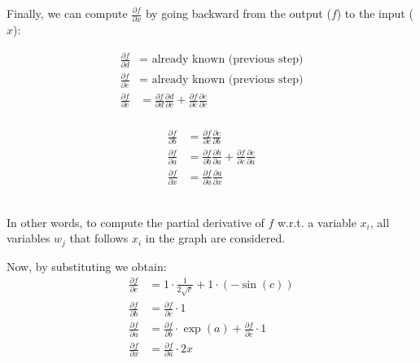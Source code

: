 \begin{example}
    Finally, we can compute $\frac{\partial f}{\partial x}$ by going backward from the output ($f$) to the input ($x$):\\
    \begin{minipage}{.5\linewidth}
        \[
            \begin{split}
                \frac{\partial f}{\partial d} &= \text{ already known (previous step)} \\
                \frac{\partial f}{\partial e} &= \text{ already known (previous step)} \\
                \frac{\partial f}{\partial c} &= 
                    \frac{\partial f}{\partial d}\frac{\partial d}{\partial c} + \frac{\partial f}{\partial e}\frac{\partial e}{\partial c} \\
            \end{split}
        \]
    \end{minipage}%
    \begin{minipage}{.5\linewidth}
        \[
            \begin{split}
                \frac{\partial f}{\partial b} &= \frac{\partial f}{\partial c}\frac{\partial c}{\partial b} \\
                \frac{\partial f}{\partial a} &= 
                    \frac{\partial f}{\partial b}\frac{\partial b}{\partial a} + \frac{\partial f}{\partial c}\frac{\partial c}{\partial a} \\
                \frac{\partial f}{\partial x} &= \frac{\partial f}{\partial a}\frac{\partial a}{\partial x}                    
            \end{split}
        \]
    \end{minipage}\\

    In other words, to compute the partial derivative of $f$ w.r.t. a variable $x_i$, 
    all variables $w_j$ that follows $x_i$ in the graph are considered.

    Now, by substituting we obtain:
    \[
        \begin{split}
        \frac{\partial f}{\partial c} &= 1 \cdot \frac{1}{2\sqrt{c}} + 1 \cdot (-\sin(c)) \\
        \frac{\partial f}{\partial b} &= \frac{\partial f}{\partial c} \cdot 1 \\
        \frac{\partial f}{\partial a} &= \frac{\partial f}{\partial b} \cdot \exp(a) + \frac{\partial f}{\partial c} \cdot 1 \\
        \frac{\partial f}{\partial x} &= \frac{\partial f}{\partial a} \cdot 2x
        \end{split}
    \] 
\end{example}